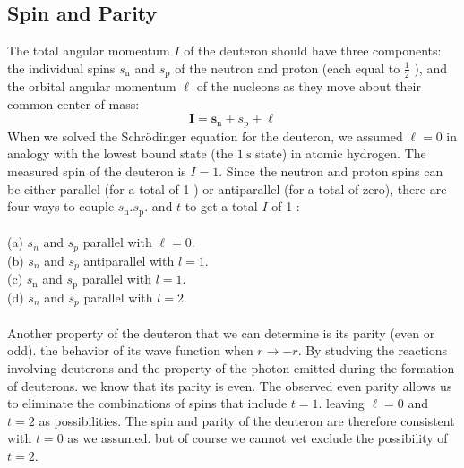  \subsection{Spin and Parity}
 The total angular momentum $I$ of the deuteron should have three components: the individual spins $s_{\mathrm{n}}$ and $s_{\mathrm{p}}$ of the neutron and proton (each equal to $\frac{1}{2}$ ), and the orbital angular momentum $\ell$ of the nucleons as they move about their common center of mass:
 $$
 \boldsymbol{I}=\boldsymbol{s}_{\mathrm{n}}+s_{\mathrm{p}}+\ell
 $$
 When we solved the Schrödinger equation for the deuteron, we assumed $\ell=0$ in analogy with the lowest bound state (the $1 \mathrm{~s}$ state) in atomic hydrogen. The measured spin of the deuteron is $I=1$. Since the neutron and proton spins can be either parallel (for a total of 1 ) or antiparallel (for a total of zero), there are four ways to couple $s_{\mathrm{n}} . s_{\mathrm{p}}$. and $t$ to get a total $I$ of 1 :\\\\
 (a) $s_{n}$ and $s_{p}$ parallel with $\ell=0$.\\
 (b) $s_{n}$ and $s_{p}$ antiparallel with $l=1$.\\
 (c) $s_{\mathrm{n}}$ and $s_{\mathrm{p}}$ parallel with $l=1$.\\
 (d) $s_{n}$ and $s_{p}$ parallel with $l=2$.\\\\
 Another property of the deuteron that we can determine is its parity (even or odd). the behavior of its wave function when $r \rightarrow-r$. By studving the reactions involving deuterons and the property of the photon emitted during the formation of deuterons. we know that its parity is even. The observed even parity allows us to eliminate the combinations of spins that include $t=1$. leaving $\ell=0$ and $t=2$ as possibilities. The spin and parity of the deuteron are therefore consistent with $t=0$ as we assumed. but of course we cannot vet exclude the possibility of $t=2$.
